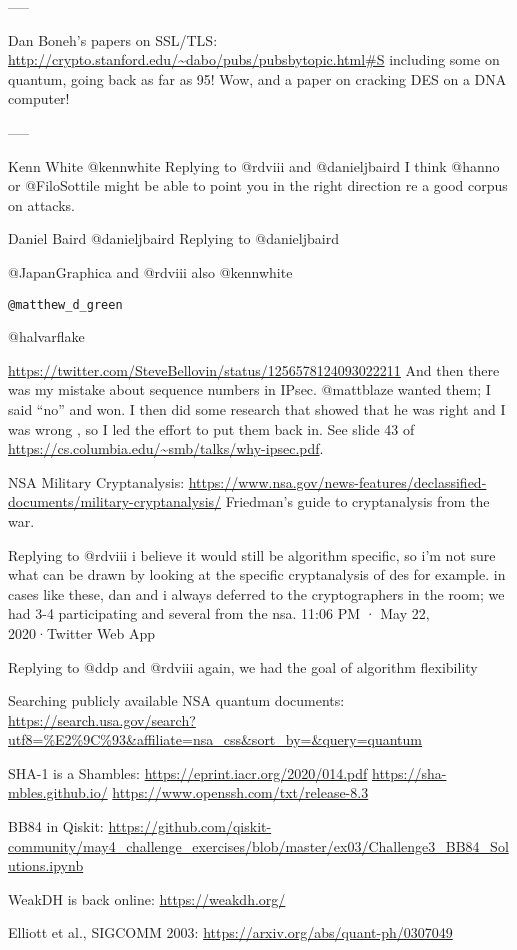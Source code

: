 \documentclass[%
 aip,
 jmp,%
 amsmath,amssymb,
 reprint,%
]{revtex4-1}
\begin{document}
-----

Dan Boneh's papers on SSL/TLS:
\url{http://crypto.stanford.edu/~dabo/pubs/pubsbytopic.html#S}
including some on quantum, going back as far as 95!
Wow, and a paper on cracking DES on a DNA computer!

-----


Kenn White
@kennwhite
Replying to 
@rdviii
 and 
@danieljbaird
I think 
@hanno
 or 
@FiloSottile
 might be able to point you in the right direction re a good corpus on
 attacks.

Daniel Baird
@danieljbaird
Replying to 
@danieljbaird
 
@JapanGraphica
 and 
@rdviii
also 
@kennwhite
  
\verb|@matthew_d_green|
  
@halvarflake

\url{https://twitter.com/SteveBellovin/status/1256578124093022211}
And then there was my mistake about sequence numbers in IPsec. 
@mattblaze
 wanted them; I said “no” and won. I then did some research that
 showed that he was right and I was wrong , so I led the effort to put
 them back in. See slide 43 of
\url{https://cs.columbia.edu/~smb/talks/why-ipsec.pdf}.

NSA Military Cryptanalysis:
\url{https://www.nsa.gov/news-features/declassified-documents/military-cryptanalysis/}
Friedman's guide to cryptanalysis from the war.

Replying to 
@rdviii
i believe it would still be algorithm specific, so i'm not sure what can be drawn by looking at the specific cryptanalysis of des for example.  in cases like these, dan and i always deferred to the cryptographers in the room; we had 3-4 participating and several from the nsa.
11:06 PM · May 22, 2020·Twitter Web App

Replying to 
@ddp
 and 
@rdviii
again, we had the goal of algorithm flexibility

Searching publicly available NSA quantum documents:
\url{https://search.usa.gov/search?utf8=%E2%9C%93&affiliate=nsa_css&sort_by=&query=quantum}

SHA-1 is a Shambles:
\url{https://eprint.iacr.org/2020/014.pdf}
\url{https://sha-mbles.github.io/}
\url{https://www.openssh.com/txt/release-8.3}

BB84 in Qiskit:
\url{https://github.com/qiskit-community/may4_challenge_exercises/blob/master/ex03/Challenge3_BB84_Solutions.ipynb}

WeakDH is back online:
\url{https://weakdh.org/}

Elliott et al., SIGCOMM 2003:
\url{https://arxiv.org/abs/quant-ph/0307049}
\end{document}
